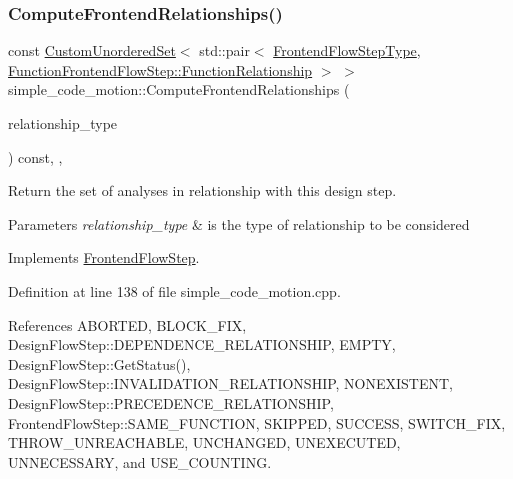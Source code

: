 \subsubsection{\texorpdfstring{Compute\+Frontend\+Relationships()}{ComputeFrontendRelationships()}}
{\footnotesize\ttfamily const \hyperlink{classCustomUnorderedSet}{Custom\+Unordered\+Set}$<$ std\+::pair$<$ \hyperlink{frontend__flow__step_8hpp_afeb3716c693d2b2e4ed3e6d04c3b63bb}{Frontend\+Flow\+Step\+Type}, \hyperlink{classFrontendFlowStep_af7cf30f2023e5b99e637dc2058289ab0}{Function\+Frontend\+Flow\+Step\+::\+Function\+Relationship} $>$ $>$ simple\+\_\+code\+\_\+motion\+::\+Compute\+Frontend\+Relationships (\begin{DoxyParamCaption}\item[{const \hyperlink{classDesignFlowStep_a723a3baf19ff2ceb77bc13e099d0b1b7}{Design\+Flow\+Step\+::\+Relationship\+Type}}]{relationship\+\_\+type }\end{DoxyParamCaption}) const\hspace{0.3cm}{\ttfamily [override]}, {\ttfamily [private]}, {\ttfamily [virtual]}}



Return the set of analyses in relationship with this design step. 


\begin{DoxyParams}{Parameters}
{\em relationship\+\_\+type} & is the type of relationship to be considered \\
\hline
\end{DoxyParams}


Implements \hyperlink{classFrontendFlowStep_abeaff70b59734e462d347ed343dd700d}{Frontend\+Flow\+Step}.



Definition at line 138 of file simple\+\_\+code\+\_\+motion.\+cpp.



References A\+B\+O\+R\+T\+ED, B\+L\+O\+C\+K\+\_\+\+F\+IX, Design\+Flow\+Step\+::\+D\+E\+P\+E\+N\+D\+E\+N\+C\+E\+\_\+\+R\+E\+L\+A\+T\+I\+O\+N\+S\+H\+IP, E\+M\+P\+TY, Design\+Flow\+Step\+::\+Get\+Status(), Design\+Flow\+Step\+::\+I\+N\+V\+A\+L\+I\+D\+A\+T\+I\+O\+N\+\_\+\+R\+E\+L\+A\+T\+I\+O\+N\+S\+H\+IP, N\+O\+N\+E\+X\+I\+S\+T\+E\+NT, Design\+Flow\+Step\+::\+P\+R\+E\+C\+E\+D\+E\+N\+C\+E\+\_\+\+R\+E\+L\+A\+T\+I\+O\+N\+S\+H\+IP, Frontend\+Flow\+Step\+::\+S\+A\+M\+E\+\_\+\+F\+U\+N\+C\+T\+I\+ON, S\+K\+I\+P\+P\+ED, S\+U\+C\+C\+E\+SS, S\+W\+I\+T\+C\+H\+\_\+\+F\+IX, T\+H\+R\+O\+W\+\_\+\+U\+N\+R\+E\+A\+C\+H\+A\+B\+LE, U\+N\+C\+H\+A\+N\+G\+ED, U\+N\+E\+X\+E\+C\+U\+T\+ED, U\+N\+N\+E\+C\+E\+S\+S\+A\+RY, and U\+S\+E\+\_\+\+C\+O\+U\+N\+T\+I\+NG.

